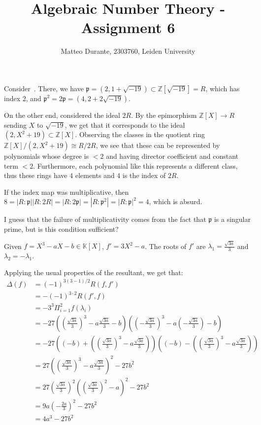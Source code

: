 \documentclass{article}
\newcommand{\numberset}{\mathbb}
\newcommand{\Z}{\numberset{Z}}
\newcommand{\K}{\numberset{K}}
\newcommand{\pid}{\mathfrak{p}}
\newcommand{\exercise}[1]{\noindent {\bf Exercise #1}}
\begin{document}
\title{Algebraic Number Theory - Assignment 6}

\author{Matteo Durante, 2303760, Leiden University}

\maketitle


\exercise{5}

Consider~\cite[ex. 2.10]{stev}. There, we have $\pid=(2,1+\sqrt{-19})\subset\Z[\sqrt{-19}]=R$, which has index 2, and $\pid^2=2\pid=(4,2+2\sqrt{-19})$.

On the other end, considered the ideal $2R$. By the epimorphism $\Z[X]\rightarrow R$ sending $X$ to $\sqrt{-19}$, we get that it corresponds to the ideal $(2,X^2+19)\subset\Z[X]$. Observing the classes in the quotient ring $\Z[X]/(2,X^2+19)\cong R/2R$, we see that these can be represented by polynomials whose degree is $<2$ and having director coefficient and constant term $<2$. Furthermore, each polynomial like this represents a different class, thus these rings have 4 elements and 4 is the index of $2R$.

If the index map was multiplicative, then $8=|R:\pid||R:2R|=|R:2\pid|=|R:\pid^2|=|R:\pid|^2=4$, which is absurd.

I guess that the failure of multiplicativity comes from the fact that $\pid$ is a singular prime, but is this condition sufficient?


\newpage

\exercise{18}

Given $f=X^3-aX-b\in\K[X]$, $f'=3X^2-a$. The roots of $f'$ are $\lambda_1=\frac{\sqrt{3a}}{3}$ and $\lambda_2=-\lambda_1$.

Applying the usual properties of the resultant, we get that:
\begin{align*}
		\Delta(f) & = (-1)^{3(3-1)/2}R(f,f') \\
		& = -(-1)^{3\cdot 2}R(f',f) \\
		& = -3^3\Pi_{i=1}^2 f(\lambda_i) \\
		& = -27\left(\left(\frac{\sqrt{3a}}{3}\right)^3-a\frac{\sqrt{3a}}{3}-b\right) \left( \left(-\frac{\sqrt{3a}}{3}\right)^3-a\left(-\frac{\sqrt{3a}}{3}\right)-b\right) \\
		& = -27\left((-b)+\left(\left(\frac{\sqrt{3a}}{3}\right)^3-a\frac{\sqrt{3a}}{3}\right)\right)\left((-b)-\left(\left(\frac{\sqrt{3a}}{3}\right)^3-a\frac{\sqrt{3a}}{3}\right)\right) \\
		& = 27\left(\left(\frac{\sqrt{3a}}{3}\right)^3-a\frac{\sqrt{3a}}{3}\right)^2-27b^2 \\
		& = 27\left(\frac{\sqrt{3a}}{3}\right)^2\left(\left(\frac{\sqrt{3a}}{3}\right)^2-a\right)^2-27b^2 \\
		& = 9a\left(-\frac{2a}{3}\right)^2-27b^2 \\
		& = 4a^3-27b^2
\end{align*}
\end{document}
